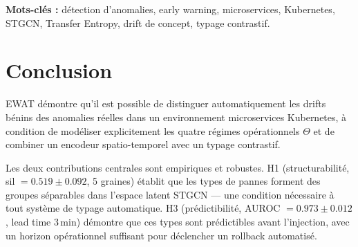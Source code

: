 \documentclass[12pt, a4paper]{article}
\begin{document}
\begin{titlepage}
  \vspace{1cm}

  \textbf{Mots-clés :} détection d'anomalies, early warning, microservices, Kubernetes,
  STGCN, Transfer Entropy, drift de concept, typage contrastif.
\end{titlepage}

\tableofcontents
\newpage



\newpage


\newpage


\newpage


\newpage


\newpage


\newpage


\newpage


\newpage


\newpage


\section*{Conclusion}

EWAT démontre qu'il est possible de distinguer automatiquement les drifts bénins des
anomalies réelles dans un environnement microservices Kubernetes, à condition de modéliser
explicitement les quatre régimes opérationnels $\Theta$ et de combiner un encodeur
spatio-temporel avec un typage contrastif.

Les deux contributions centrales sont empiriques et robustes. H1 (structurabilité,
sil $= 0.519 \pm 0.092$, 5 graines) établit que les types de pannes forment des groupes
séparables dans l'espace latent STGCN — une condition nécessaire à tout système de typage
automatique. H3 (prédictibilité, AUROC $= 0.973 \pm 0.012$, lead time $3$\,min)
démontre que ces types sont prédictibles avant l'injection, avec un horizon opérationnel
suffisant pour déclencher un rollback automatisé.
\end{document}

